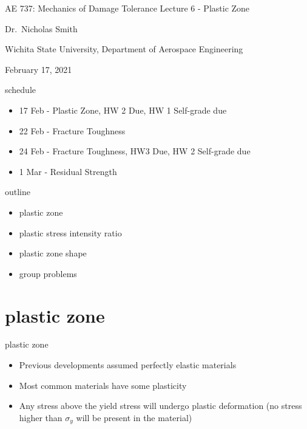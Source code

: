 \documentclass[
  letterpaper,
  ignorenonframetext,
  aspectratio=43,
  handout,
  12pt]{beamer}
\author{}
\date{}
\providecommand{\tightlist}{%
  \setlength{\itemsep}{0pt}\setlength{\parskip}{0pt}}
\providecommand{\tightlist}{%
\setlength{\itemsep}{0pt}\setlength{\parskip}{0pt}}
\begin{document}
\begin{frame}{AE 737: Mechanics of Damage Tolerance}
\protect\hypertarget{ae-737-mechanics-of-damage-tolerance}{}
Lecture 6 - Plastic Zone

Dr.~Nicholas Smith

Wichita State University, Department of Aerospace Engineering

February 17, 2021
\end{frame}

\begin{frame}{schedule}
\protect\hypertarget{schedule}{}
\begin{itemize}
\tightlist
\item
  17 Feb - Plastic Zone, HW 2 Due, HW 1 Self-grade due
\item
  22 Feb - Fracture Toughness
\item
  24 Feb - Fracture Toughness, HW3 Due, HW 2 Self-grade due
\item
  1 Mar - Residual Strength
\end{itemize}
\end{frame}

\begin{frame}{outline}
\protect\hypertarget{outline}{}
\begin{itemize}
\tightlist
\item
  plastic zone
\item
  plastic stress intensity ratio
\item
  plastic zone shape
\item
  group problems
\end{itemize}
\end{frame}

\hypertarget{plastic-zone}{%
\section{plastic zone}\label{plastic-zone}}

\begin{frame}{plastic zone}
\protect\hypertarget{plastic-zone-1}{}
\begin{itemize}
\tightlist
\item
  Previous developments assumed perfectly elastic materials
\item
  Most common materials have some plasticity
\item
  Any stress above the yield stress will undergo plastic deformation (no
  stress higher than \(\sigma_y\) will be present in the material)
\end{itemize}
\end{frame}
\end{document}
